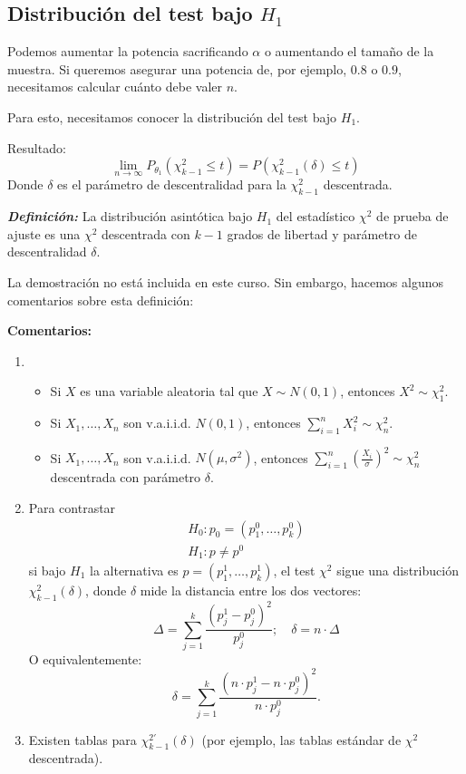\subsection{Distribución del test bajo $H_1$}

Podemos aumentar la potencia sacrificando \(\alpha\) o aumentando el tamaño de la muestra.  
Si queremos asegurar una potencia de, por ejemplo, \(0.8\) o \(0.9\), necesitamos calcular cuánto debe valer \(n\).

Para esto, necesitamos conocer la distribución del test bajo \(H_1\).

Resultado:
\[
\lim_{n \to \infty} P_{\theta_1} (\chi^2_{k-1} \leq t) = P(\chi^2_{k-1}(\delta) \leq t)
\]
Donde \(\delta\) es el parámetro de descentralidad para la \(\chi^2_{k-1}\) descentrada.

\textit{\textbf{Definición:}} La distribución asintótica bajo \(H_1\) del estadístico \(\chi^2\) de prueba de ajuste es una \(\chi^2\) descentrada con \(k-1\) grados de libertad y parámetro de descentralidad \(\delta\).

La demostración no está incluida en este curso. Sin embargo, hacemos algunos comentarios sobre esta definición:

\textbf{Comentarios:} %
\begin{enumerate}
    \item   \begin{itemize}
        \item Si \(X\) es una variable aleatoria tal que \(X \sim N(0,1)\), entonces \(X^2 \sim \chi^2_1\).
        \item Si \(X_1, \dots, X_n\) son v.a.i.i.d. \(N(0,1)\), entonces \(\sum_{i=1}^{n} X_i^2 \sim \chi^2_n\).
        \item Si \(X_1, \dots, X_n\) son v.a.i.i.d. \(N(\mu, \sigma^2)\), entonces 
        \(
        \sum_{i=1}^{n} \left( \frac{X_i}{\sigma} \right)^2 \sim \chi^2_n
        \)
        descentrada con parámetro $\delta$.
    \end{itemize}
    \item Para contrastar 
    \[
    \begin{matrix}
        H_0: p_0 = (p_1^0, \dots, p_k^0) \\
        H_1: p \neq p^0
    \end{matrix}
    \]
    si bajo \(H_1\) la alternativa 
    es \(p = (p_1^1, \dots, p_k^1)\), el test \(\chi^2\) sigue 
    una distribución \(\chi^2_{k-1}(\delta)\), donde \(\delta\) 
    mide la distancia entre los dos vectores:
    \[
    \Delta = \sum_{j=1}^{k} \frac{(p_j^1 - p_j^0)^2}{p_j^0}; \quad \delta = n \cdot \Delta
    \]
    O equivalentemente:
    \[
    \delta = \sum_{j=1}^{k} \frac{\left( n \cdot p_j^1 - n \cdot p_j^0 \right)^2}{n \cdot p_j^0}.
    \]
    \item Existen tablas para $\chi_{k-1}^{2'}(\delta)$ (por ejemplo, las tablas estándar de $\chi^2$ descentrada).
\end{enumerate}



